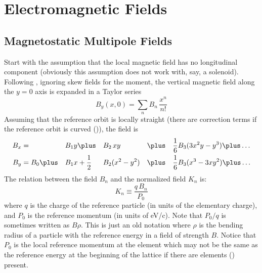 \chapter{Electromagnetic Fields}

\section{Magnetostatic Multipole Fields}
\label{s:mag.field}

Start with the assumption that the local magnetic field has no longitudinal component
(obviously this assumption does not work with, say, a solenoid).  Following \mad, ignoring
skew fields for the moment, the vertical magnetic field along the $y = 0$ axis is expanded
in a Taylor series
\begin{equation}
  B_y(x, 0) = \sum_n B_n \, \frac{x^n}{n!}
  \label{byx0b}
\end{equation}
Assuming that the reference orbit is locally straight (there are correction terms if the
reference orbit is curved ()), the field is
\begin{alignat}{5}
  B_x &=           &&B_1 y \plus         &&B_2 \, xy       
                   && \plus && \frac{1}{6} B_3 (3x^2 y - y^3) \plus \ldots \CRNO
  B_y &= B_0 \plus &&B_1 x + \frac{1}{2} &&B_2 (x^2 - y^2) 
                   && \plus && \frac{1}{6} B_3 (x^3 - 3x y^2) \plus \ldots
  \label{bbb}
\end{alignat}
The relation between the field $B_n$ and the normalized field $K_n$ is:
\begin{equation}
  K_n \equiv \frac{q \, B_n}{P_0}
  \label{kqlbp}
\end{equation}
where $q$ is the charge of the reference particle (in units of the elementary charge), and $P_0$ is
the reference momentum (in units of eV/c).  Note that $P_0/q$ is sometimes written as $B\rho$. This
is just an old notation where $\rho$ is the bending radius of a particle with the reference energy
in a field of strength $B$. Notice that $P_0$ is the local reference momentum at the element which
may not be the same as the reference energy at the beginning of the lattice if there are
 elements () present.

